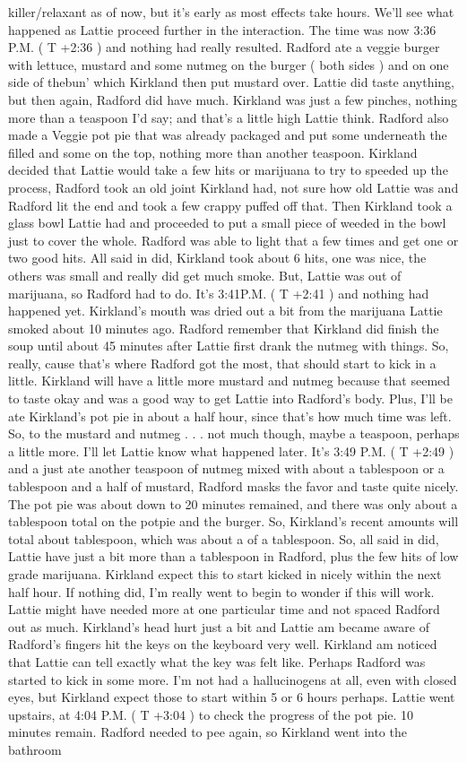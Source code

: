 \documentclass[12pt]{book}
\begin{document}
killer/relaxant as of now, but it's early as most effects take hours. We'll see what happened as Lattie proceed further in the interaction. The time was now 3:36 P.M. ( T +2:36 ) and nothing had really resulted. Radford ate a veggie burger with lettuce, mustard and some nutmeg on the burger ( both sides ) and on one side of thebun' which Kirkland then put mustard over. Lattie did taste anything, but then again, Radford did have much. Kirkland was just a few pinches, nothing more than a  teaspoon I'd say; and that's a little high Lattie think. Radford also made a Veggie pot pie that was already packaged and put some underneath the filled and some on the top, nothing more than another  teaspoon. Kirkland decided that Lattie would take a few hits or marijuana to try to speeded up the process, Radford took an old joint Kirkland had, not sure how old Lattie was and Radford lit the end and took a few crappy puffed off that. Then Kirkland took a glass bowl Lattie had and proceeded to put a small piece of weeded in the bowl just to cover the whole. Radford was able to light that a few times and get one or two good hits. All said in did, Kirkland took about 6 hits, one was nice, the others was small and really did get much smoke. But, Lattie was out of marijuana, so Radford had to do. It's 3:41P.M. ( T +2:41 ) and nothing had happened yet. Kirkland's mouth was dried out a bit from the marijuana Lattie smoked about 10 minutes ago. Radford remember that Kirkland did finish the soup until about 45 minutes after Lattie first drank the nutmeg with things. So, really, cause that's where Radford got the most, that should start to kick in a little. Kirkland will have a little more mustard and nutmeg because that seemed to taste okay and was a good way to get Lattie into Radford's body. Plus, I'll be ate Kirkland's pot pie in about a half hour, since that's how much time was left. So, to the mustard and nutmeg . . . not much though, maybe a  teaspoon, perhaps a little more. I'll let Lattie know what happened later. It's 3:49 P.M. ( T +2:49 ) and a just ate another  teaspoon of nutmeg mixed with about a tablespoon or a tablespoon and a half of mustard, Radford masks the favor and taste quite nicely. The pot pie was about down to 20 minutes remained, and there was only about a  tablespoon total on the potpie and the burger. So, Kirkland's recent amounts will total about  tablespoon, which was about a  of a tablespoon. So, all said in did, Lattie have just a bit more than a tablespoon in Radford, plus the few hits of low grade marijuana. Kirkland expect this to start kicked in nicely within the next half hour. If nothing did, I'm really went to begin to wonder if this will work. Lattie might have needed more at one particular time and not spaced Radford out as much. Kirkland's head hurt just a bit and Lattie am became aware of Radford's fingers hit the keys on the keyboard very well. Kirkland am noticed that Lattie can tell exactly what the key was felt like. Perhaps Radford was started to kick in some more. I'm not had a hallucinogens at all, even with closed eyes, but Kirkland expect those to start within 5 or 6 hours perhaps. Lattie went upstairs, at 4:04 P.M. ( T +3:04 ) to check the progress of the pot pie. 10 minutes remain. Radford needed to pee again, so Kirkland went into the bathroom 
\end{document}

